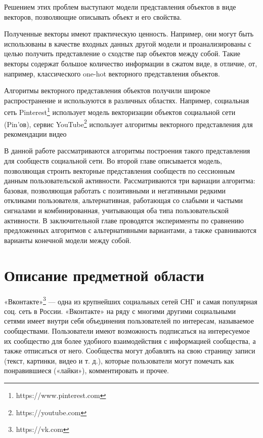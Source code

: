 \documentclass[times,specification,annotation]{itmo-student-thesis}
\begin{document}
Решением этих проблем выступают модели представления объектов в виде векторов, позволяющие описывать объект и его свойства.

Полученные векторы имеют практическую ценность. Например, они могут быть использованы в
качестве входных данных другой модели и проанализированы с целью
получить представление о сходстве пар объектов между собой. Такие векторы содержат большое количество информации в сжатом виде, в отличие, от, например, классического one-hot векторного представления объектов.

Алгоритмы векторного представления объектов получили широкое распространение и используются в различных областях. Например, социальная сеть Pinterest\footnote{https://www.pinterest.com} \cite{Liu2017} использует модель векторизации объектов социальной сети (Pin'ов), сервис YouTube\footnote{https://youtube.com} использует алгоритмы векторного представления для рекомендации видео\cite{Covington2016} 

В данной работе рассматриваются алгоритмы построения такого представления для сообществ социальной сети. Во второй главе описывается модель, позволяющая строить векторные представления сообществ по сессионным данным пользовательской активности. Рассматриваются три вариации алгоритма: базовая, позволяющая работать с позитивными и негативными редкими откликами пользователя, альтернативная, работающая со слабыми и частыми сигналами и комбинированная, учитывающая оба типа пользовательской активности. В заключительной главе проводятся эксперименты по сравнению предложенных алгоритмов с альтернативными вариантами, а также сравниваются варианты конечной модели между собой. 

\chapter{Описание предметной области}

«Вконтакте»\footnote{https://vk.com} --- одна из крупнейших социальных сетей СНГ и самая
популярная соц. сеть в России. «Вконтакте» на ряду с многими другими
социальными сетями имеет внутри себя объединения пользователей по интересам,
называемое сообществами. Пользователи имеют возможность подписаться на
интересуемое их сообщество для более удобного взаимодействия с информацией
сообщества, а также отписаться от него. Сообщества могут добавлять на свою
страницу записи (текст, картинки, видео и т. д.), которые пользователи могут
помечать как понравившиеся («лайки»), комментировать и прочее.
\end{document}
